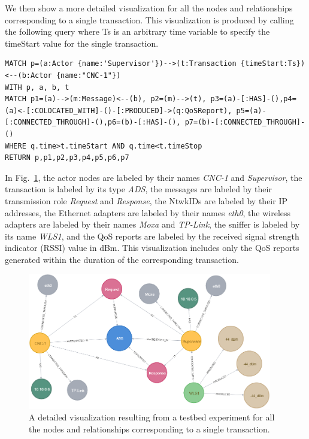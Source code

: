 We then show a more detailed visualization for all the nodes and relationships corresponding to a single transaction. This visualization is produced by calling the following query where Ts is an arbitrary time variable to specify the timeStart value for the single transaction. 

\begin{lstlisting}
MATCH p=(a:Actor {name:'Supervisor'})-->(t:Transaction {timeStart:Ts})<--(b:Actor {name:"CNC-1"})
WITH p, a, b, t
MATCH p1=(a)-->(m:Message)<--(b), p2=(m)-->(t), p3=(a)-[:HAS]-(),p4=(a)<-[:COLOCATED_WITH]-()-[:PRODUCED]->(q:QoSReport), p5=(a)-[:CONNECTED_THROUGH]-(),p6=(b)-[:HAS]-(), p7=(b)-[:CONNECTED_THROUGH]-()
WHERE q.time>t.timeStart AND q.time<t.timeStop
RETURN p,p1,p2,p3,p4,p5,p6,p7
\end{lstlisting}

In Fig.~\ref{gdbappl:fig::Sample-graph_2}, the actor nodes are labeled by their names \textit{CNC-1} and \textit{Supervisor}, the transaction is labeled by its type \textit{ADS}, the messages are labeled by their transmission role \textit{Request} and \textit{Response}, the NtwkIDs are labeled by their IP addresses, the Ethernet adapters are labeled by their names \textit{eth0}, the wireless adapters are labeled by their names \textit{Moxa} and \textit{TP-Link}, the sniffer is labeled by its name \textit{WLS1}, and the QoS reports are labeled by the received signal strength indicator (RSSI) value in dBm. This visualization includes only the QoS reports generated within the duration of the corresponding transaction.   

\begin{figure}[!h]
    \centering
    \includegraphics[width=0.95\textwidth]{./chapter-gdb-appl/figures/database/graph_Single_trans.png}
    \caption{A detailed visualization resulting from a testbed experiment for all the nodes and relationships corresponding to a single transaction. }
    \label{gdbappl:fig::Sample-graph_2}
\end{figure}

